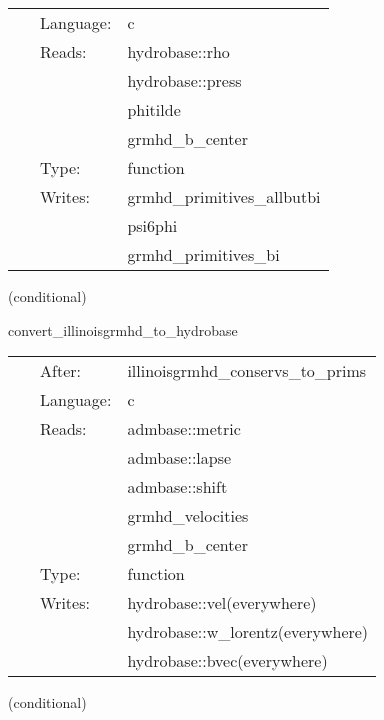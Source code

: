 \documentclass{article}
\begin{document}
\hspace{5mm}

 \begin{tabular*}{160mm}{cll} 
~ & Language:  & c \\ 
~ & Reads:  & hydrobase::rho \\ 
~& ~ &hydrobase::press\\ 
~& ~ &phitilde\\ 
~& ~ &grmhd\_b\_center\\ 
~ & Type:  & function \\ 
~ & Writes:  & grmhd\_primitives\_allbutbi \\ 
~& ~ &psi6phi\\ 
~& ~ &grmhd\_primitives\_bi\\ 
\end{tabular*} 


\vspace{5mm}

   (conditional) 

\hspace{5mm} convert\_illinoisgrmhd\_to\_hydrobase 

\hspace{5mm}{\it convert illinoisgrmhd-native variables to hydrobase } 


\hspace{5mm}

 \begin{tabular*}{160mm}{cll} 
~ & After:  & illinoisgrmhd\_conservs\_to\_prims \\ 
~ & Language:  & c \\ 
~ & Reads:  & admbase::metric \\ 
~& ~ &admbase::lapse\\ 
~& ~ &admbase::shift\\ 
~& ~ &grmhd\_velocities\\ 
~& ~ &grmhd\_b\_center\\ 
~ & Type:  & function \\ 
~ & Writes:  & hydrobase::vel(everywhere) \\ 
~& ~ &hydrobase::w\_lorentz(everywhere)\\ 
~& ~ &hydrobase::bvec(everywhere)\\ 
\end{tabular*} 


\vspace{5mm}

   (conditional) 
\end{document}
